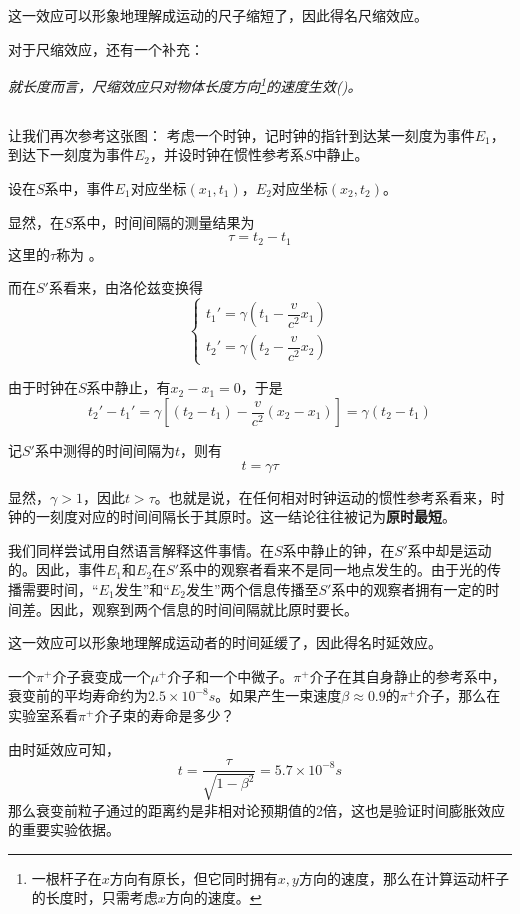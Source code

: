 这一效应可以形象地理解成运动的尺子缩短了，因此得名尺缩效应。

对于尺缩效应，还有一个补充：
\begin{center}
    \em 就长度而言，尺缩效应只对物体长度方向\footnote{\eg 一根杆子在$x$方向有原长，但它同时拥有$x,y$方向的速度，那么在计算运动杆子的长度时，只需考虑$x$方向的速度。}的速度生效()。
\end{center}

\subsection[动钟变慢]{}
让我们再次参考这张图：
考虑一个时钟，记时钟的指针到达某一刻度为事件$E_1$，到达下一刻度为事件$E_2$，并设时钟在惯性参考系$S$中静止。

设在$S$系中，事件$E_1$对应坐标$(x_1,t_1)$，$E_2$对应坐标$(x_2,t_2)$。

显然，在$S$系中，时间间隔的测量结果为
\[\tau=t_2-t_1\]
这里的$\tau$称为 。

而在$S'$系看来，由洛伦兹变换得
\[\left\{\begin{array}{l}
        t_1'=\gamma(t_1-\dfrac{v}{c^2} x_1) \\[1ex]
        t_2'=\gamma(t_2-\dfrac{v}{c^2} x_2)
    \end{array}\right.\]

由于时钟在$S$系中静止，有$x_2-x_1=0$，于是
\[t_2'-t_1'=\gamma[(t_2-t_1)-\dfrac{v}{c^2}(x_2-x_1)]=\gamma(t_2-t_1)\]

记$S'$系中测得的时间间隔为$t$，则有
\begin{equation}
    t=\gamma\tau
\end{equation}

显然，$\gamma > 1$，因此$t>\tau$。也就是说，在任何相对时钟运动的惯性参考系看来，时钟的一刻度对应的时间间隔长于其原时。这一结论往往被记为\textbf{原时最短}。

我们同样尝试用自然语言解释这件事情。在$S$系中静止的钟，在$S'$系中却是运动的。因此，事件$E_1$和$E_2$在$S'$系中的观察者看来不是同一地点发生的。由于光的传播需要时间，``$E_1$发生''和``$E_2$发生''两个信息传播至$S'$系中的观察者拥有一定的时间差。因此，观察到两个信息的时间间隔就比原时要长。

这一效应可以形象地理解成运动者的时间延缓了，因此得名时延效应。
\begin{ex}[$\pi^+$介子衰变]
    一个$\pi^+$介子衰变成一个$\mu^+$介子和一个中微子。$\pi^+$介子在其自身静止的参考系中，衰变前的平均寿命约为$2.5\times10^{-8}s$。如果产生一束速度$\beta\approx 0.9$的$\pi^+$介子，那么在实验室系看$\pi^+$介子束的寿命是多少？
\end{ex}
\begin{so}[$\pi^+$介子衰变]
    由时延效应可知，
    \[t=\frac{\tau}{\sqrt{1-\beta^2}}=5.7\times10^{-8}s\]
    那么衰变前粒子通过的距离约是非相对论预期值的2倍，这也是验证时间膨胀效应的重要实验依据。
\end{so}
